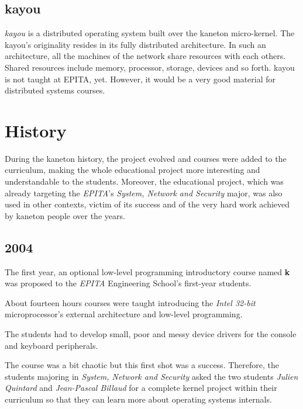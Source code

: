 \begin{multicols}{2}
\subsection{kayou}

\textit{kayou} is a distributed operating system built over the kaneton
micro-kernel. The kayou's originality resides in its fully distributed
architecture. In such an architecture, all the machines of the network share
resources with each others. Shared resources include memory, processor,
storage, devices and so forth. kayou is not taught at EPITA, yet. However,
it would be a very good material for distributed systems courses.

%
%

\section{History}

During the kaneton history, the project evolved and courses were added
to the curriculum, making the whole educational project more interesting and
understandable to the students. Moreover, the educational project, which
was already targeting the \textit{EPITA}'s \textit{System, Network and
Security} major, was also used in other contexts, victim of its success
and of the very hard work achieved by kaneton people over the years.

%
%

\subsection{2004}

The first year, an optional low-level programming introductory course named
\textbf{k} was proposed to the \textit{EPITA} Engineering School's first-year
students.

About fourteen hours courses were taught introducing the \textit{Intel 32-bit}
microprocessor's external architecture and low-level programming.

The students had to develop small, poor and messy device drivers for the
console and keyboard peripherals.

The course was a bit chaotic but this first shot was a success. Therefore, the
students majoring in \textit{System, Network and Security} asked the two
students \textit{Julien Quintard} and \textit{Jean-Pascal Billaud} for a
complete kernel project within their curriculum so that they can learn more
about operating systems internals.


\end{multicols}
